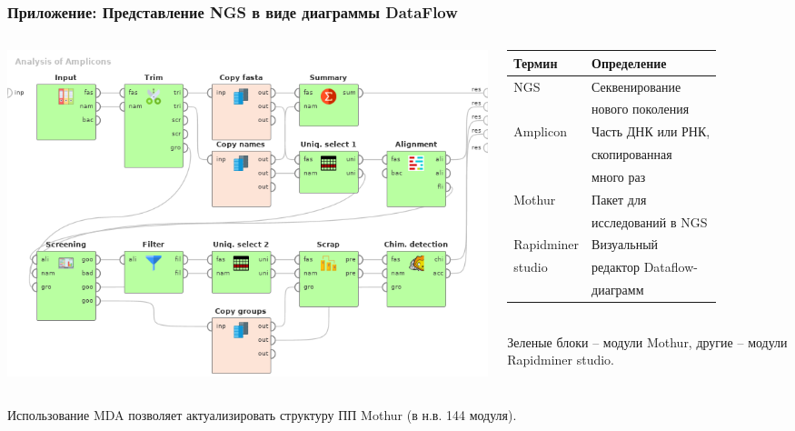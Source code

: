 \documentclass[10pt]{beamer}
\begin{document}
\begin{frame}
  \frametitle{Приложение: Представление NGS в виде диаграммы DataFlow}
  \begin{columns}
    \begin{column}{0.6\textwidth}
      \begin{raggedright}
        \includegraphics[width=1\linewidth]{Dataflow-color-en.png}
      \end{raggedright}
    \end{column}
    \begin{column}{0.4\textwidth}\footnotesize
      \begin{tabular}{ll}
        Термин & Определение \\
        \hline
        NGS & Секвенирование \\ & нового поколения\\
        Amplicon & Часть ДНК или РНК, \\
               & скопированная  \\
               & много раз \\
        Mothur & Пакет для\\ & исследований в NGS \\
        Rapidminer & Визуальный \\
        studio     & редактор Dataflow-\\
             & диаграмм
      \end{tabular}
      ${}$\\[1em]
      Зеленые блоки -- модули Mothur, другие -- модули Rapidminer studio.
    \end{column}
  \end{columns}
  \vspace{1em}
  Использование MDA позволяет актуализировать структуру ПП Mothur (в н.в. 144 модуля).
\end{frame}
\end{document}
